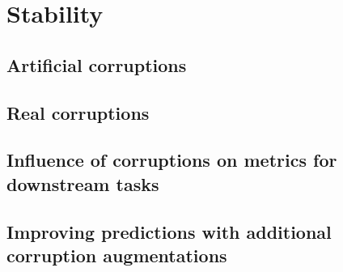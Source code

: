 \section{Stability}
    \subsection{Artificial corruptions}
        
    \subsection{Real corruptions}
    \subsection{Influence of corruptions on metrics for downstream tasks}
    \subsection{Improving predictions with additional corruption augmentations}